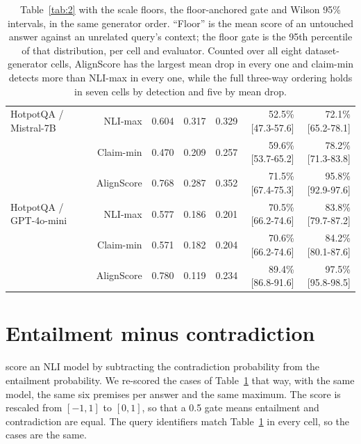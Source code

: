 \documentclass[11pt]{article}
\begin{document}
\begin{table}[t]
\begin{tabular}{lrrrrrr}
HotpotQA / Mistral-7B & NLI-max & 0.604 & 0.317 & 0.329 & 52.5\% [47.3-57.6] & 72.1\% [65.2-78.1] \\
 & Claim-min & 0.470 & 0.209 & 0.257 & 59.6\% [53.7-65.2] & 78.2\% [71.3-83.8] \\
 & AlignScore & 0.768 & 0.287 & 0.352 & 71.5\% [67.4-75.3] & 95.8\% [92.9-97.6] \\
HotpotQA / GPT-4o-mini & NLI-max & 0.577 & 0.186 & 0.201 & 70.5\% [66.2-74.6] & 83.8\% [79.7-87.2] \\
 & Claim-min & 0.571 & 0.182 & 0.204 & 70.6\% [66.2-74.6] & 84.2\% [80.1-87.6] \\
 & AlignScore & 0.780 & 0.119 & 0.234 & 89.4\% [86.8-91.6] & 97.5\% [95.8-98.5] \\
\bottomrule
\end{tabular}
\caption{Table~\ref{tab:2} with the scale floors, the floor-anchored gate and Wilson 95\% intervals, in the same generator order. ``Floor'' is the mean score of an untouched answer against an unrelated query's context; the floor gate is the 95th percentile of that distribution, per cell and evaluator. Counted over all eight dataset-generator cells, AlignScore has the largest mean drop in every one and claim-min detects more than NLI-max in every one, while the full three-way ordering holds in seven cells by detection and five by mean drop.}
\label{tab:2full}
\end{table}

\section{Entailment minus contradiction}
\label{app:ec}

\citet{steen-etal-2023} score an NLI model by subtracting the contradiction probability from the entailment probability. We re-scored the cases of Table~\ref{tab:2full} that way, with the same model, the same six premises per answer and the same maximum. The score is rescaled from $[-1,1]$ to $[0,1]$, so that a 0.5 gate means entailment and contradiction are equal. The query identifiers match Table~\ref{tab:2full} in every cell, so the cases are the same.
\end{document}
